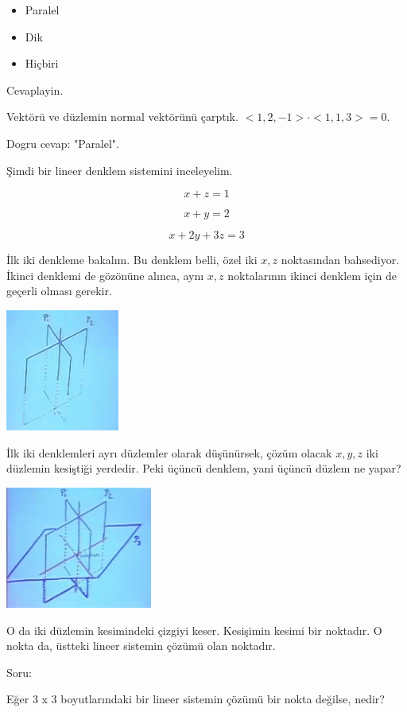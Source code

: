 \documentclass[12pt,fleqn]{article}\usepackage{../../common}
\begin{document}
\begin{itemize}
   \item Paralel
   \item Dik
   \item Hiçbiri
\end{itemize}

Cevaplayin. 

Vektörü ve düzlemin normal vektörünü çarptık. $< 1,2,-1 >\cdot< 1,1,3 > =
0$. 

Dogru cevap: "Paralel".

Şimdi bir lineer denklem sistemini inceleyelim.

$$ x + z = 1  $$

$$ x + y = 2 $$

$$ x + 2y + 3z = 3 $$

İlk iki denkleme bakalım. Bu denklem belli, özel iki $x,z$ noktasından
bahsediyor. İkinci denklemi de gözönüne alınca, aynı $x,z$ noktalarının ikinci
denklem için de geçerli olması gerekir.

\includegraphics[height=4cm]{4_3.png}

İlk iki denklemleri ayrı düzlemler olarak düşünürsek, çözüm olacak $x,y,z$ iki
düzlemin kesiştiği yerdedir. Peki üçüncü denklem, yani üçüncü düzlem ne yapar?

\includegraphics[height=4cm]{4_4.png}

O da iki düzlemin kesimindeki çizgiyi keser. Kesişimin kesimi bir
noktadır. O nokta da, üstteki lineer sistemin çözümü olan noktadır. 

Soru: 

Eğer 3 x 3 boyutlarındaki bir lineer sistemin çözümü bir nokta değilse,
nedir? 
\end{document}
